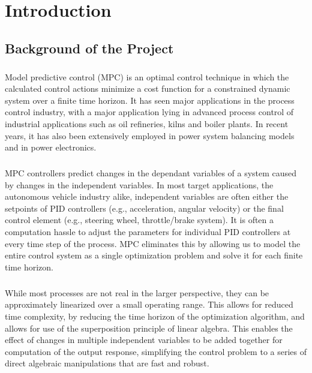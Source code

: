 \chapter{Introduction}
\section{Background of the Project}
\paragraph{}
Model predictive control (MPC) is an optimal control technique in which the calculated control actions minimize a cost function for a constrained dynamic system over a finite time horizon. It has seen major applications in the process control industry, with a major application lying in advanced process control of industrial applications such as oil refineries, kilns and boiler plants. In recent years, it has also been extensively employed in power system balancing models and in power electronics.

\paragraph{}
MPC controllers predict changes in the dependant variables of a system caused by changes in the independent variables. In most target applications, the autonomous vehicle industry alike, independent variables are often either the setpoints of PID controllers (e.g., acceleration, angular velocity) or the final control element (e.g., steering wheel, throttle/brake system). It is often a computation hassle to adjust the parameters for individual PID controllers at every time step of the process. MPC eliminates this by allowing us to model the entire control system as a single optimization problem and solve it for each finite time horizon.

\paragraph{}
While most processes are not real in the larger perspective, they can be approximately linearized over a small operating range. This allows for reduced time complexity, by reducing the time horizon of the optimization algorithm, and allows for use of the superposition principle of linear algebra. This enables the effect of changes in multiple independent variables to be added together for computation of the output response, simplifying the control problem to a series of direct algebraic manipulations that are fast and robust.

